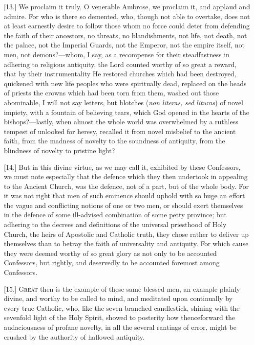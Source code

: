[13.] We proclaim it truly, O venerable Ambrose, we proclaim it, and applaud and admire. For who is there so demented, who, though not able to overtake, does not at least earnestly desire to follow those whom no force could deter from defending the faith of their ancestors, no threats, no blandishments, not life, not death, not the palace, not the Imperial Guards, not the Emperor, not the empire itself, not men, not demons?—whom, I say, as a recompense for their steadfastness in adhering to religious antiquity, the Lord counted worthy of so great a reward, that by their instrumentality He restored churches which had been destroyed, quickened with new life peoples who were spiritually dead, replaced on the heads of priests the crowns which had been torn from them, washed out those abominable, I will not say letters, but blotches (\emph{non literas, sed lituras}) of novel impiety, with a fountain of believing tears, which God opened in the hearts of the bishops?—lastly, when almost the whole world was overwhelmed by a ruthless tempest of unlooked for heresy, recalled it from novel misbelief to the ancient faith, from the madness of novelty to the soundness of antiquity, from the blindness of novelty to pristine light?

[14.] But in this divine virtue, as we may call it, exhibited by these Confessors, we must note especially that the defence which they then undertook in appealing to the Ancient Church, was the defence, not of a part, but of the whole body. For it was not right that men of such eminence should uphold with so huge an effort the vague and conflicting notions of one or two men, or should exert themselves in the defence of some ill-advised combination of some petty province; but adhering to the decrees and definitions of the universal priesthood of Holy Church, the heirs of Apostolic and Catholic truth, they chose rather to deliver up themselves than to betray the faith of universality and antiquity. For which cause they were deemed worthy of so great glory as not only to be accounted Confessors, but rightly, and deservedly to be accounted foremost among Confessors.


[15.] \textsc{Great} then is the example of these same blessed men, an example plainly divine, and worthy to be called to mind, and meditated upon continually by every true Catholic, who, like the seven-branched candlestick, shining with the sevenfold light of the Holy Spirit, showed to posterity how thenceforward the audaciousness of profane novelty, in all the several rantings of error, might be crushed by the authority of hallowed antiquity.

